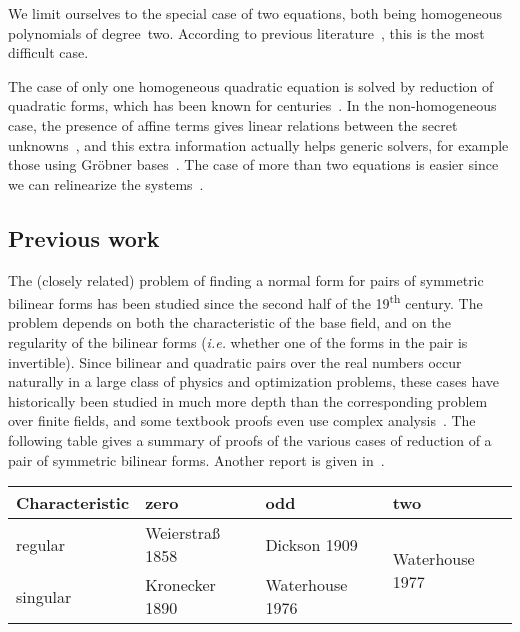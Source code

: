 \documentclass{lms}
\begin{document}
We limit ourselves to the special case of two equations, both
being homogeneous polynomials of degree~two. According to previous
literature~\cite{DBLP:conf/eurocrypt/Perret05,DBLP:conf/eurocrypt/FaugereP06,DBLP:conf/pkc/BouillaguetFFP11,DBLP:conf/eurocrypt/BouillaguetFV13},
this is the most difficult case.

The case of only one homogeneous quadratic equation
is solved by reduction of quadratic forms,
which has been known for centuries~\cite{gauss,lidl1997finite}.
In the non-homogeneous case, the presence of affine terms
gives linear relations between
the secret unknowns~\cite{DBLP:conf/eurocrypt/PatarinGC98},
and this extra information actually helps generic solvers,
for example those using Gröbner bases~\cite{DBLP:conf/eurocrypt/FaugereP06}.
The case of more than two equations is easier since we can relinearize
the systems~\cite{DBLP:conf/pkc/BouillaguetFFP11}.

\subsection*{Previous work}

The (closely related) problem of finding a normal form
for pairs of symmetric bilinear forms
has been studied since the second half of the 19\textsuperscript{th} century.
The problem depends on both the characteristic of the base field,
and on the regularity of the bilinear forms
(\emph{i.e.} whether one of the forms in the pair is invertible).
Since bilinear and quadratic pairs over the real numbers occur naturally
in a large class of physics and optimization problems,
these cases have historically been studied in much more depth
than the corresponding problem over finite fields,
and some textbook proofs even use complex analysis~\cite[XII(56)]{Gantmacher}.
The following table gives a summary of proofs of the various cases
of reduction of a pair of symmetric bilinear forms.
Another report is given in~\cite{olomouc2004fv}.

\setlength\tabcolsep{.5em}\smallbreak
\begin{center}\begin{tabular}{l|lll}
Characteristic & zero & odd & two \\
\toprule
regular & Weierstraß 1858\cite{1858weierstrass}
  & Dickson 1909\cite{ams1909dickson}
  & \multirow{2}{*}{Waterhouse 1977\cite{pacific1977waterhouse}} \\
singular & Kronecker 1890\cite{1890kronecker}
  & Waterhouse 1976\cite{inventiones1976waterhouse} & \\
\bottomrule
\end{tabular}\end{center}\medbreak
\end{document}
